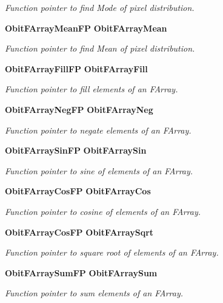 \begin{CompactItemize}
\begin{CompactList}\small\item\em Function pointer to find Mode of pixel distribution. \item\end{CompactList}\item 
{\bf Obit\-FArray\-Mean\-FP} {\bf Obit\-FArray\-Mean}
\begin{CompactList}\small\item\em Function pointer to find Mean of pixel distribution. \item\end{CompactList}\item 
{\bf Obit\-FArray\-Fill\-FP} {\bf Obit\-FArray\-Fill}
\begin{CompactList}\small\item\em Function pointer to fill elements of an FArray. \item\end{CompactList}\item 
{\bf Obit\-FArray\-Neg\-FP} {\bf Obit\-FArray\-Neg}
\begin{CompactList}\small\item\em Function pointer to negate elements of an FArray. \item\end{CompactList}\item 
{\bf Obit\-FArray\-Sin\-FP} {\bf Obit\-FArray\-Sin}
\begin{CompactList}\small\item\em Function pointer to sine of elements of an FArray. \item\end{CompactList}\item 
{\bf Obit\-FArray\-Cos\-FP} {\bf Obit\-FArray\-Cos}
\begin{CompactList}\small\item\em Function pointer to cosine of elements of an FArray. \item\end{CompactList}\item 
{\bf Obit\-FArray\-Cos\-FP} {\bf Obit\-FArray\-Sqrt}
\begin{CompactList}\small\item\em Function pointer to square root of elements of an FArray. \item\end{CompactList}\item 
{\bf Obit\-FArray\-Sum\-FP} {\bf Obit\-FArray\-Sum}
\begin{CompactList}\small\item\em Function pointer to sum elements of an FArray. \item\end{CompactList}\item 

\end{CompactItemize}
